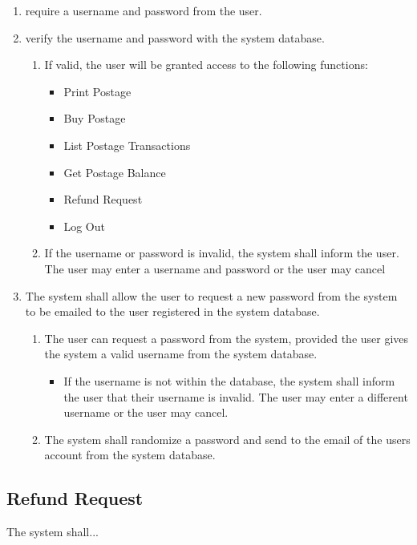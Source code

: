 \documentclass{scrreprt}
\begin{document}
\begin{enumerate}
\item require a username and password from the user.
\item verify the username and password with the system database.
\begin{enumerate}
\item If valid, the user will be granted access to the following functions:
\begin{itemize}
\item Print Postage
\item Buy Postage
\item List Postage Transactions
\item Get Postage Balance
\item Refund Request
\item Log Out
\end{itemize}
\item If the username or password is invalid, the system shall inform the user.
The user may enter a  username and password or the user may cancel 
\end{enumerate}
\item The system shall allow the user to request a new password from the system
to be emailed to the user registered in the system database.
\begin{enumerate}
\item The user can request a password from the system, provided the user gives
the system a valid username from the system database.
\begin{itemize}
\item If the username is not within the database, the system shall inform the
user that their username is invalid. The user may enter a different username or
the user may cancel.
\end{itemize}
\item The system shall randomize a password and send to the email of the users
account from the system database.
\end{enumerate}
\end{enumerate}

\subsection{Refund Request}

The system shall...
\end{document}
